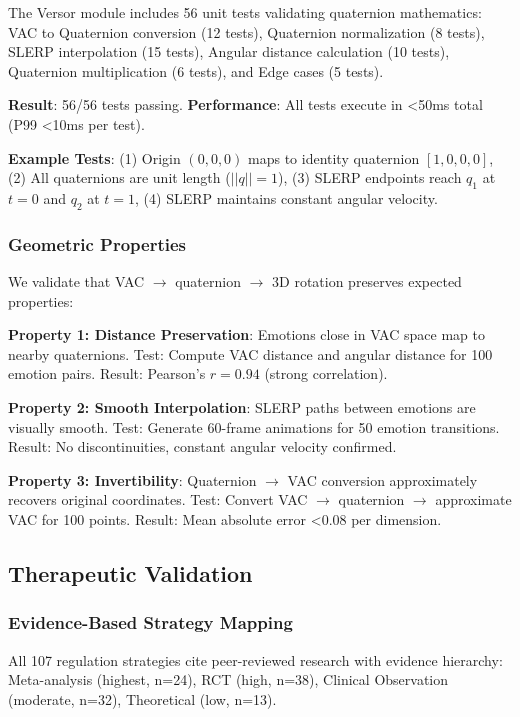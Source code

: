 \documentclass[10pt,twocolumn]{article}
\begin{document}
The Versor module includes 56 unit tests validating quaternion mathematics: VAC to Quaternion conversion (12 tests), Quaternion normalization (8 tests), SLERP interpolation (15 tests), Angular distance calculation (10 tests), Quaternion multiplication (6 tests), and Edge cases (5 tests).

\textbf{Result}: 56/56 tests passing. \textbf{Performance}: All tests execute in <50ms total (P99 <10ms per test).

\textbf{Example Tests}: (1) Origin $(0,0,0)$ maps to identity quaternion $[1, 0, 0, 0]$, (2) All quaternions are unit length ($||q|| = 1$), (3) SLERP endpoints reach $q_1$ at $t=0$ and $q_2$ at $t=1$, (4) SLERP maintains constant angular velocity.

\subsubsection{Geometric Properties}

We validate that VAC $\rightarrow$ quaternion $\rightarrow$ 3D rotation preserves expected properties:

\textbf{Property 1: Distance Preservation}: Emotions close in VAC space map to nearby quaternions. Test: Compute VAC distance and angular distance for 100 emotion pairs. Result: Pearson's $r = 0.94$ (strong correlation).

\textbf{Property 2: Smooth Interpolation}: SLERP paths between emotions are visually smooth. Test: Generate 60-frame animations for 50 emotion transitions. Result: No discontinuities, constant angular velocity confirmed.

\textbf{Property 3: Invertibility}: Quaternion $\rightarrow$ VAC conversion approximately recovers original coordinates. Test: Convert VAC $\rightarrow$ quaternion $\rightarrow$ approximate VAC for 100 points. Result: Mean absolute error <0.08 per dimension.

\subsection{Therapeutic Validation}

\subsubsection{Evidence-Based Strategy Mapping}

All 107 regulation strategies cite peer-reviewed research with evidence hierarchy: Meta-analysis (highest, n=24), RCT (high, n=38), Clinical Observation (moderate, n=32), Theoretical (low, n=13).
\end{document}
